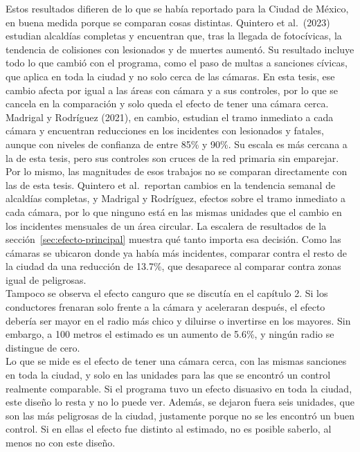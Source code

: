 Estos resultados difieren de lo que se había reportado para la Ciudad de México, en buena medida porque se comparan cosas distintas. Quintero et al.\ (2023) estudian alcaldías completas y encuentran que, tras la llegada de fotocívicas, la tendencia de colisiones con lesionados y de muertes aumentó. Su resultado incluye todo lo que cambió con el programa, como el paso de multas a sanciones cívicas, que aplica en toda la ciudad y no solo cerca de las cámaras. En esta tesis, ese cambio afecta por igual a las áreas con cámara y a sus controles, por lo que se cancela en la comparación y solo queda el efecto de tener una cámara cerca. Madrigal y Rodríguez (2021), en cambio, estudian el tramo inmediato a cada cámara y encuentran reducciones en los incidentes con lesionados y fatales, aunque con niveles de confianza de entre 85\% y 90\%. Su escala es más cercana a la de esta tesis, pero sus controles son cruces de la red primaria sin emparejar. Por lo mismo, las magnitudes de esos trabajos no se comparan directamente con las de esta tesis. Quintero et al.\ reportan cambios en la tendencia semanal de alcaldías completas, y Madrigal y Rodríguez, efectos sobre el tramo inmediato a cada cámara, por lo que ninguno está en las mismas unidades que el cambio en los incidentes mensuales de un área circular. La escalera de resultados de la sección~\ref{sec:efecto-principal} muestra qué tanto importa esa decisión. Como las cámaras se ubicaron donde ya había más incidentes, comparar contra el resto de la ciudad da una reducción de 13.7\%, que desaparece al comparar contra zonas igual de peligrosas.\\

Tampoco se observa el efecto canguro que se discutía en el capítulo 2. Si los conductores frenaran solo frente a la cámara y aceleraran después, el efecto debería ser mayor en el radio más chico y diluirse o invertirse en los mayores. Sin embargo, a 100 metros el estimado es un aumento de 5.6\%, y ningún radio se distingue de cero.\\

Lo que se mide es el efecto de tener una cámara cerca, con las mismas sanciones en toda la ciudad, y solo en las unidades para las que se encontró un control realmente comparable. Si el programa tuvo un efecto disuasivo en toda la ciudad, este diseño lo resta y no lo puede ver. Además, se dejaron fuera seis unidades, que son las más peligrosas de la ciudad, justamente porque no se les encontró un buen control. Si en ellas el efecto fue distinto al estimado, no es posible saberlo, al menos no con este diseño.\\

